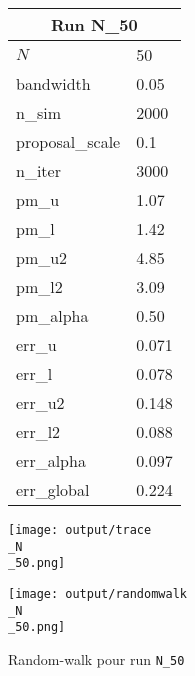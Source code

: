 
\begin{figure}[H]
  \centering
  \begin{minipage}[t]{0.45\textwidth}
    \vspace{0pt}
    \footnotesize
    \begin{tabular}{|l|l|}\hline
    \multicolumn{2}{|c|}{\textbf{Run N\_50}} \\ \hline
    $N$ & 50 \\ \hline
    bandwidth & 0.05 \\ \hline
    n\_sim & 2000 \\ \hline
    proposal\_scale & 0.1 \\ \hline
    n\_iter & 3000 \\ \hline
    pm\_u & 1.07 \\ \hline
    pm\_l & 1.42 \\ \hline
    pm\_u2 & 4.85 \\ \hline
    pm\_l2 & 3.09 \\ \hline
    pm\_alpha & 0.50 \\ \hline
    err\_u & 0.071 \\ \hline
    err\_l & 0.078 \\ \hline
    err\_u2 & 0.148 \\ \hline
    err\_l2 & 0.088 \\ \hline
    err\_alpha & 0.097 \\ \hline
    err\_global & 0.224 \\ \hline
    \end{tabular}
  \end{minipage}
  \hfill
  \begin{minipage}[t]{0.45\textwidth}
    \vspace{0pt}
    \texttt{[image: output/trace\\\_N\\\_50.png]}
  \end{minipage}
\end{figure}

\begin{figure}[H]
  \centering
  \texttt{[image: output/randomwalk\\\_N\\\_50.png]}
  \caption{Random-walk pour run \texttt{N\_50}}
\end{figure}

